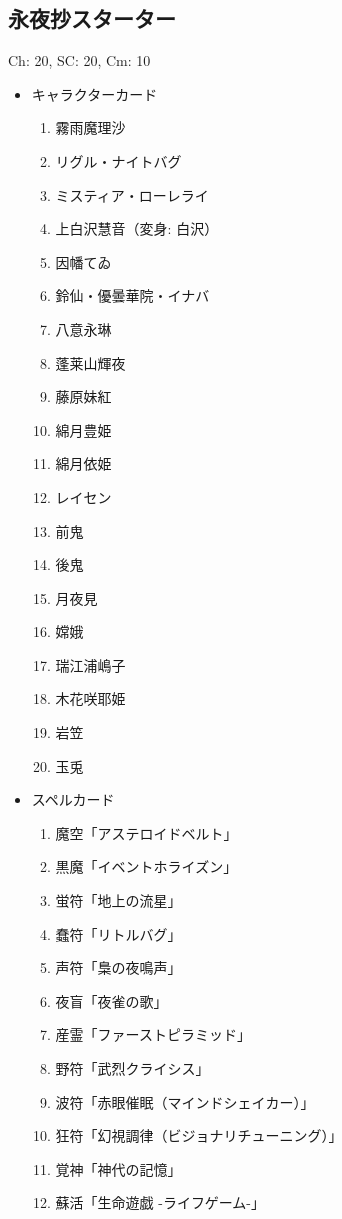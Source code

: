 \documentclass[line_length=22zw,number_of_lines=45,twocolumn]{jlreq}
\begin{document}
\subsection{永夜抄スターター}
Ch: 20, SC: 20, Cm: 10
\begin{itemize}
	\item キャラクターカード
		\begin{enumerate}
			\item 霧雨魔理沙
			\item リグル・ナイトバグ
			\item ミスティア・ローレライ
			\item 上白沢慧音（変身: 白沢）
			\item 因幡てゐ
			\item 鈴仙・優曇華院・イナバ
			\item 八意永琳
			\item 蓬莱山輝夜
			\item 藤原妹紅
			\item 綿月豊姫
			\item 綿月依姫
			\item レイセン
			\item 前鬼
			\item 後鬼
			\item 月夜見
			\item 嫦娥
			\item 瑞江浦嶋子
			\item 木花咲耶姫
			\item 岩笠
			\item 玉兎
		\end{enumerate}
	\item スペルカード
		\begin{enumerate}
			\item 魔空「アステロイドベルト」
			\item 黒魔「イベントホライズン」
			\item 蛍符「地上の流星」
			\item 蠢符「リトルバグ」
			\item 声符「梟の夜鳴声」
			\item 夜盲「夜雀の歌」
			\item 産霊「ファーストピラミッド」
			\item 野符「武烈クライシス」
			\item 波符「赤眼催眠（マインドシェイカー）」
			\item 狂符「幻視調律（ビジョナリチューニング）」
			\item 覚神「神代の記憶」
			\item 蘇活「生命遊戯 -ライフゲーム-」

\end{enumerate}
\end{itemize}
\end{document}
